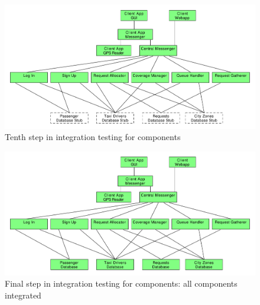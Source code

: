 \begin{figure}
\centering
\includegraphics[width=\textwidth]{tex-images/comp-10}
\caption{Tenth step in integration testing for components}
\end{figure}

\begin{figure}
\centering
\includegraphics[width=\textwidth]{tex-images/comp-11}
\caption{Final step in integration testing for components: all components integrated}
\end{figure}